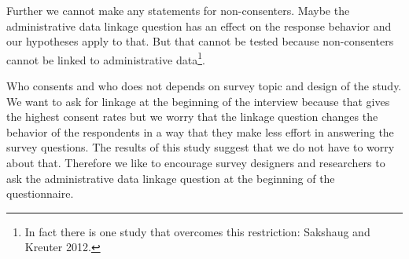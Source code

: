 Further we cannot make any statements for non-consenters. Maybe the administrative data linkage question has an effect on the response behavior and our hypotheses apply to that. But that cannot be tested because non-consenters cannot be linked to administrative data\footnote{In fact there is one study that overcomes this restriction: Sakshaug and Kreuter 2012.}.

Who consents and who does not depends on survey topic and design of the study. We want to ask for linkage at the beginning of the interview because that gives the highest consent rates but we worry that the linkage question changes the behavior of the respondents in a way that they make less effort in answering the survey questions. The results of this study suggest that we do not have to worry about that. Therefore we like to encourage survey designers and researchers to ask the administrative data linkage question at the beginning of the questionnaire.


